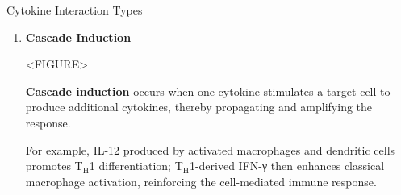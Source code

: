 \begin{core}{Cytokine Interaction Types}
\begin{enumerate}
          For example, IFN-γ promotes T$_{\text{H}}$1-associated immunity and can oppose IL-4-driven T$_{\text{H}}$2 differentiation and IgE class switching.

        \item \textbf{Cascade Induction}

          <FIGURE>

          \textbf{Cascade induction} occurs when one cytokine stimulates a target cell to produce additional cytokines, thereby propagating and amplifying the response.

          For example, IL-12 produced by activated macrophages and dendritic cells promotes T$_{\text{H}}$1 differentiation; T$_{\text{H}}$1-derived IFN-γ then enhances classical macrophage activation, reinforcing the cell-mediated immune response.

      \end{enumerate}

    \end{core}
